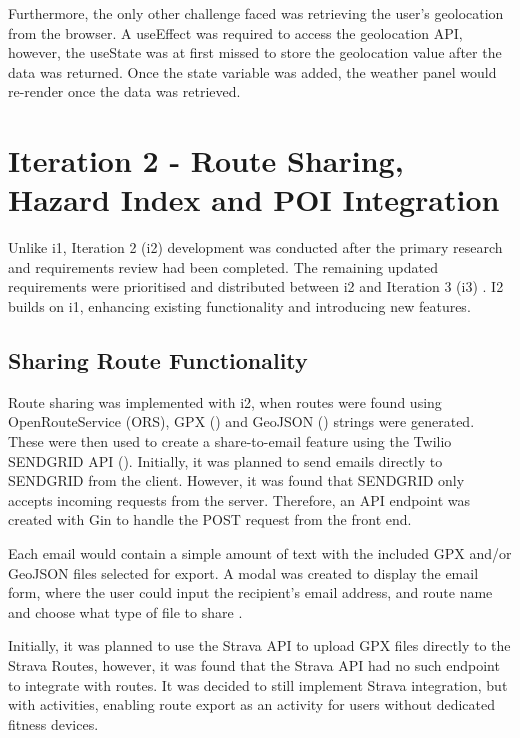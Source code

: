 Furthermore, the only other challenge faced was retrieving the user's geolocation from the browser. A useEffect was required to access the geolocation API, however, the useState was at first missed to store the geolocation value after the data was returned. Once the state variable was added, the weather panel would re-render once the data was retrieved.

\section{Iteration 2 - Route Sharing, Hazard Index and POI Integration}
\label{implementation:iteration2}

Unlike i1, Iteration 2 (i2) development was conducted after the primary research and requirements review had been completed. The remaining updated requirements were prioritised and distributed between i2 and Iteration 3 (i3) . I2 builds on i1, enhancing existing functionality and introducing new features. 

\subsection{Sharing Route Functionality}
\label{iteration2:sharing-route}

Route sharing was implemented with i2, when routes were found using OpenRouteService (ORS), GPX (\cite{noauthor_gpx_nodate}) and GeoJSON (\cite{noauthor_geojson_nodate}) strings were generated. These were then used to create a share-to-email feature using the Twilio SENDGRID API (\cite{noauthor_email_nodate}). Initially, it was planned to send emails directly to SENDGRID from the client. However, it was found that SENDGRID only accepts incoming requests from the server. Therefore, an API endpoint was created with Gin to handle the POST request from the front end. 

Each email would contain a simple amount of text with the included GPX and/or GeoJSON files selected for export. A modal was created to display the email form, where the user could input the recipient's email address, and route name and choose what type of file to share .

Initially, it was planned to use the Strava API to upload GPX files directly to the Strava Routes, however, it was found that the Strava API had no such endpoint to integrate with routes. It was decided to still implement Strava integration, but with activities, enabling route export as an activity for users without dedicated fitness devices. 

